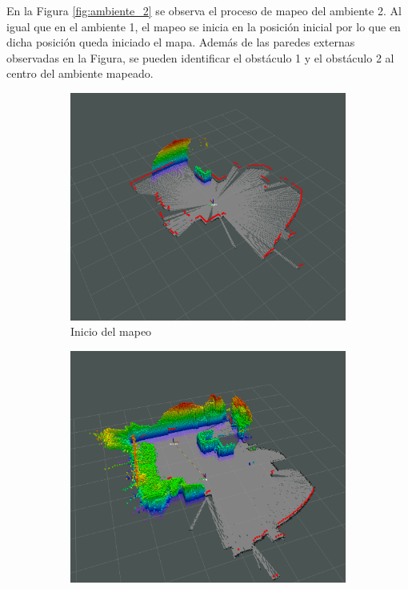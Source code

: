 En la Figura \ref{fig:ambiente_2} se observa el proceso de mapeo del ambiente 2. Al igual que en el ambiente 1, el mapeo se inicia en la posición inicial por lo que en dicha posición queda iniciado el mapa. Además de las paredes externas observadas en la Figura, se pueden identificar el obstáculo 1 y el obstáculo 2 al centro del ambiente mapeado. 
\begin{figure}[H]
    \centering
    \begin{subfigure}[b]{0.30\textwidth}
    \includegraphics[width=\textwidth, height=\textwidth]{figures/05experimentacion/ambiente_2/r01_01.png}
    \caption{Inicio del mapeo}
    \label{fig:ambiente_2_1}
    \end{subfigure}
    \begin{subfigure}[b]{0.30\textwidth}
    \includegraphics[width=\textwidth, height=\textwidth]{figures/05experimentacion/ambiente_2/r01_02.png}

\end{subfigure}
\end{figure}
